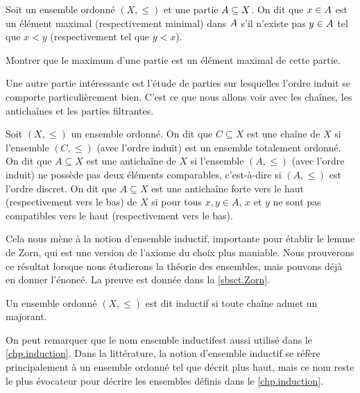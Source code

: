 \begin{definition}
  Soit un ensemble ordonné $(X,\leq)$ et une partie $A\subseteq X$. On dit
  que $x \in A$ est un élément maximal (respectivement minimal) dans
  $A$ s'il n'existe pas $y\in A$ tel que $x < y$ (respectivement tel
  que $y < x$).
\end{definition}

\begin{exercise}
  Montrer que le maximum d'une partie est un élément maximal de cette partie.
\end{exercise}

Une autre partie intéressante est l'étude de parties sur lesquelles l'ordre
induit se comporte particulièrement bien. C'est ce que nous allons voir avec les
chaînes, les antichaînes et les parties filtrantes.

\begin{definition}
  Soit $(X,\leq)$ un ensemble ordonné. On dit que $C\subseteq X$ est une chaîne
  de $X$ si l'ensemble $(C,\leq)$ (avec l'ordre induit) est un ensemble
  totalement ordonné. On dit que $A\subseteq X$ est une antichaîne de $X$ si
  l'ensemble $(A,\leq)$ (avec l'ordre induit) ne possède pas deux éléments
  comparables, c'est-à-dire si $(A,\leq)$ est l'ordre discret. On dit que
  $A\subseteq X$ est une antichaîne forte vers le haut (respectivement vers le
  bas) de $X$ si pour tous $x,y\in A$, $x$ et $y$ ne sont pas compatibles vers
  le haut (respectivement vers le bas).
\end{definition}

Cela nous mène à la notion d'ensemble inductif, importante pour établir le lemme
de Zorn, qui est une version de l'axiome du choix plus maniable. Nous
prouverons ce résultat lorsque nous étudierons la théorie des ensembles, mais
pouvons déjà en donner l'énoncé. La preuve est donnée dans la \cref{sbsct.Zorn}.

\begin{definition}
  Un ensemble ordonné $(X,\leq)$ est dit inductif si toute chaîne admet un
  majorant.
\end{definition}

\begin{remark}
  On peut remarquer que le nom \og ensemble inductif\fg est aussi utilisé dans
  le \cref{chp.induction}. Dans la littérature, la notion d'ensemble inductif
  se réfère principalement à un ensemble ordonné tel que décrit plus haut, mais
  ce nom reste le plus évocateur pour décrire les ensembles définis dans le
  \cref{chp.induction}.
\end{remark}

